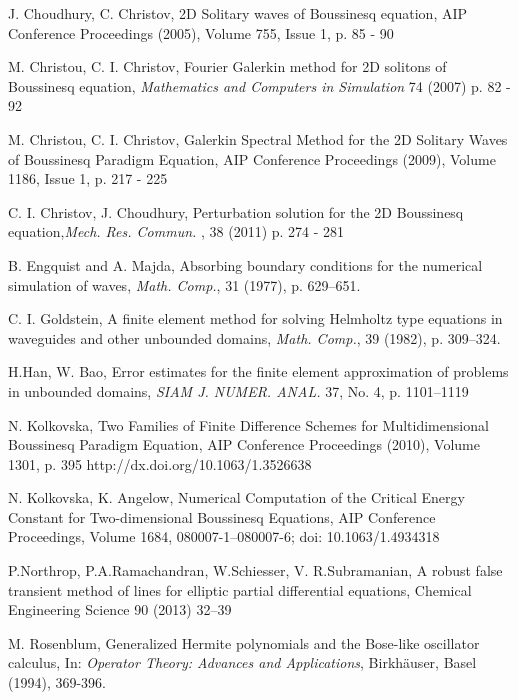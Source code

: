 \documentclass[12pt]{article}
\theoremstyle{theorem}
\theoremstyle{defi}
\begin{document}
\begin{thebibliography}{99}
  J. Choudhury, C. Christov, 2D Solitary waves of Boussinesq equation, AIP Conference Proceedings (2005), Volume 755, Issue 1, p. 85 - 90

  M. Christou, C. I. Christov, Fourier Galerkin method for 2D solitons of Boussinesq equation,  {\it Mathematics and Computers in Simulation} 74 (2007) p. 82 - 92

   M. Christou, C. I. Christov, Galerkin Spectral Method for the 2D Solitary Waves of Boussinesq Paradigm Equation, AIP Conference Proceedings (2009), Volume 1186, Issue 1, p. 217 - 225

 C. I. Christov, J. Choudhury, Perturbation solution for the 2D Boussinesq equation,{\it Mech. Res. Commun. }, 38 (2011) p. 274 - 281

 B. Engquist and A. Majda, Absorbing boundary conditions for the numerical simulation of waves, {\it Math. Comp.}, 31 (1977), p. 629–651.

  C. I. Goldstein, A finite element method for solving Helmholtz type equations in waveguides and other unbounded domains, {\it Math. Comp.}, 39 (1982), p. 309–324.

  H.Han, W. Bao, Error estimates for the finite element approximation of problems in unbounded domains,  {\it SIAM J. NUMER. ANAL.} 37, No. 4, p. 1101–1119

 N. Kolkovska, Two Families of Finite Difference Schemes for Multidimensional Boussinesq Paradigm Equation, AIP Conference Proceedings (2010), Volume 1301, p. 395 http://dx.doi.org/10.1063/1.3526638

 N. Kolkovska, K. Angelow, Numerical Computation of the Critical Energy Constant for Two-dimensional Boussinesq Equations,  AIP Conference Proceedings, Volume 1684, 080007-1–080007-6; doi: 10.1063/1.4934318

 P.Northrop, P.A.Ramachandran, W.Schiesser, V. R.Subramanian, A robust false transient method of lines for elliptic partial differential equations, Chemical Engineering Science 90 (2013) 32–39


 M. Rosenblum,
Generalized Hermite polynomials and the Bose-like oscillator
calculus, In: {\it Operator Theory: Advances and Applications},
Birkh\"auser, Basel (1994), 369-396.

\end{thebibliography}
\end{document}
